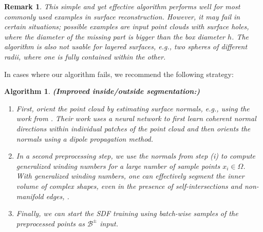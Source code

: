 \documentclass[draft,12pt,openany]{book}
\theoremstyle{plainnormal}
\newtheorem{remark}[theorem]{Remark}
\newtheorem{algorithm}[theorem]{Algorithm}
\theoremstyle{remark}
\begin{document}
\begin{remark}
    This simple and yet effective algorithm performs well for most commonly used examples in surface reconstruction. However, it may fail in certain situations; possible examples are input point clouds with surface holes, where the diameter of the missing part is bigger than the box diameter $h$. The algorithm is also not usable for layered surfaces, e.g., two spheres of different radii, where one is fully contained within the other.
\end{remark}
    In cases where our algorithm fails, we recommend the following strategy: 
    \begin{algorithm}\label{improvedInsideOutside}\textbf{(Improved inside/outside segmentation:)}
        \begin{enumerate}
            \item First, orient the point cloud by estimating surface normals, e.g., using the work from \cite{Metzer_2021}. Their work uses a neural network to first learn coherent normal directions within individual patches of the point cloud and then orients the normals using a dipole propagation method. 
            \item In a second preprocessing step, we use the normals from step (i) to compute generalized winding numbers for a large number of sample points $x_i\in \Omega$. With generalized winding numbers, one can effectively segment the inner volume of complex shapes, even in the presence of self-intersections and non-manifold edges, \cite{10.1145/2461912.2461916}.
            \item Finally, we can start the SDF training using batch-wise samples of the preprocessed points as $\mathcal{B}^\pm$ input.
        \end{enumerate}
    \end{algorithm} 
 
\end{document}
